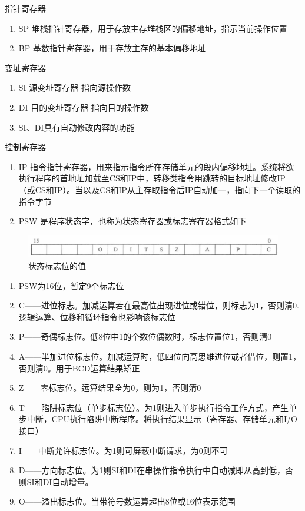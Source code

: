 \documentclass{article}
\begin{document}
指针寄存器

\begin{enumerate}
    \item SP 堆栈指针寄存器，用于存放主存堆栈区的偏移地址，指示当前操作位置
    \item BP 基数指针寄存器，用于存放主存的基本偏移地址
\end{enumerate}

变址寄存器

\begin{enumerate}
    \item SI 源变址寄存器 指向源操作数
    \item DI 目的变址寄存器 指向目的操作数
    \item SI、DI具有自动修改内容的功能
\end{enumerate}

控制寄存器

\begin{enumerate}
    \item IP 指令指针寄存器，用来指示指令所在存储单元的段内偏移地址。系统将欲执行程序的首地址加载至CS和IP中，转移类指令用跳转的目标地址修改IP（或CS和IP）。当以及CS和IP从主存取指令后IP自动加一，指向下一个读取的指令字节
    \item PSW 是程序状态字，也称为状态寄存器或标志寄存器格式如下
\end{enumerate}

\begin{figure}[H]
    \centering
    \includegraphics[width=12cm]{img/2.1-3.png}
    \caption{状态标志位的值}
\end{figure}

\begin{enumerate}
    \item  PSW为16位，暂定9个标志位
    \item C——进位标志。加减运算若在最高位出现进位或错位，则标志为1，否则清0.逻辑运算、位移和循环指令也影响该标志位
    \item P——奇偶标志位。低8位中1的个数位偶数时，标志位置位1，否则清0
    \item A——半加进位标志位。加减运算时，低四位向高思维进位或者借位，则置1，否则清0。用于BCD运算结果矫正
    \item Z——零标志位。运算结果全为0，则为1，否则清0
    \item T——陷阱标志位（单步标志位）。为1则进入单步执行指令工作方式，产生单步中断，CPU执行陷阱中断程序。将执行结果显示（寄存器、存储单元和I/O接口）
    \item I——中断允许标志位。为1则可屏蔽中断请求，为0则不可
    \item D——方向标志位。为1则SI和DI在串操作指令执行中自动减即从高到低，否则SI和DI自动增量。
    \item O——溢出标志位。当带符号数运算超出8位或16位表示范围
\end{enumerate}
\end{document}
